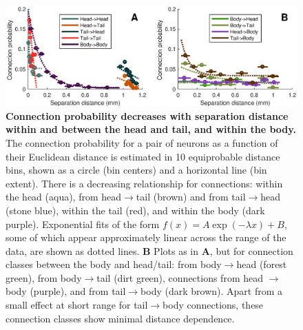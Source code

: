 \documentclass[10pt,letterpaper]{article}
\begin{document}
\begin{figure}[h]
  \centering
    \includegraphics[width=\textwidth]{connectionProbability.eps}
  \caption{
\textbf{Connection probability decreases with separation distance within and between the head and tail, and within the body.}
The connection probability for a pair of neurons as a function of their Euclidean distance is estimated in 10 equiprobable distance bins, shown as a circle (bin centers) and a horizontal line (bin extent).
There is a decreasing relationship for connections: within the head (aqua), from head$\rightarrow$tail (brown) and from tail$\rightarrow$head (stone blue), within the tail (red), and within the body (dark purple).
Exponential fits of the form $f(x) = A\exp(-\lambda x) + B$, some of which appear approximately linear across the range of the data, are shown as dotted lines.
\textbf{B}
Plots as in \textbf{A}, but for connection classes between the body and head/tail: from body$\rightarrow$head (forest green), from body$\rightarrow$tail (dirt green), connections from head $\rightarrow$ body (purple), and from tail$\rightarrow$body (dark brown).
Apart from a small effect at short range for tail$\rightarrow$body connections, these connection classes show minimal distance dependence.
  }
  \label{fig:connectionProb}
\end{figure}

\end{document}
